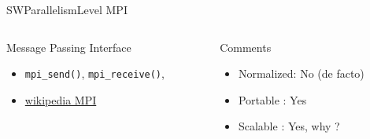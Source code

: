 %
\begin{Frame}{SWParallelismLevel MPI}
  \begin{columns}[t]
    \begin{column}{5cm} %
      \begin{block}{Message Passing Interface}
        \begin{itemize}
        \item \texttt{mpi\_send()}, \texttt{mpi\_receive()}, 
        \item
          \href{https://en.wikipedia.org/wiki/Message_Passing_Interface}{wikipedia MPI}
        \end{itemize}
      \end{block} 
    \end{column}
    
    \begin{column}{5cm} %
      \begin{alertblock}{Comments}
        \begin{itemize}
        \item Normalized: No (de facto)
        \item Portable : Yes
        \item Scalable : Yes, why ?
        \end{itemize}
      \end{alertblock}   
    \end{column}
  \end{columns}  
\end{Frame}


